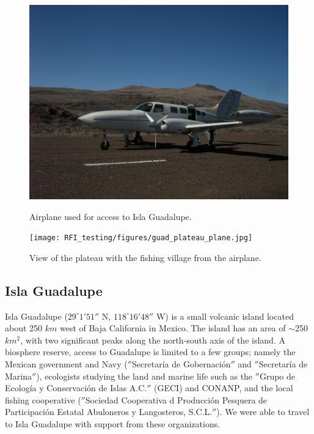 \begin{figure}[tb]
\centering
\begin{minipage}[b]{0.45\textwidth}
\centering
\includegraphics[width=0.95\linewidth]{RFI_testing/figures/guad_plane.jpg}
\caption{Airplane used for access to Isla Guadalupe.}
\label{Fig:guadplane}
\end{minipage}%
\begin{minipage}[b]{0.02\textwidth}
\hspace{1cm}
\end{minipage}%
\begin{minipage}[b]{0.49\textwidth}
\centering
\texttt{[image: RFI\_testing/figures/guad\_plateau\_plane.jpg]}
\caption{View of the plateau with the fishing village from the airplane.}
\label{Fig:guadplateau}
\end{minipage}
\end{figure}


\subsection{Isla Guadalupe}

Isla Guadalupe ($29^\circ 1' 51''$ N, $118^\circ 16' 48''$ W) is a small volcanic island located about 250 $km$ west of Baja California in Mexico. The island has an area of $\sim$250 $km^2$, with two significant peaks along the north-south axis of the island. A biosphere reserve, access to Guadalupe is limited to a few groups; namely the Mexican government and Navy ($''$Secretar\'{i}a de Gobernaci\'{o}n$''$ and $''$Secretar\'{i}a de Marina$''$), ecologists studying the land and marine life such as the $''$Grupo de Ecolog\'{i}a y Conservaci\'{o}n de Islas A.C.$''$ (GECI) and CONANP, and the local fishing cooperative ($''$Sociedad Cooperativa d Producci\'{o}n Pesquera de Participaci\'{o}n Estatal Abuloneros y Langosteros, S.C.L.$''$). We were able to travel to Isla Guadalupe with support from these organizations. 

